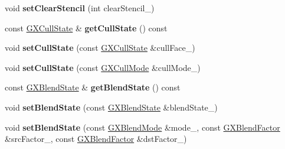 \begin{DoxyCompactItemize}
\item 
void {\bfseries set\+Clear\+Stencil} (int clear\+Stencil\+\_\+)\hypertarget{class_magnum_1_1_g_x_context_a7424d08a9c7340d0867ecd800e5f40be}{}\label{class_magnum_1_1_g_x_context_a7424d08a9c7340d0867ecd800e5f40be}

\item 
const \hyperlink{class_magnum_1_1_g_x_cull_state}{G\+X\+Cull\+State} \& {\bfseries get\+Cull\+State} () const \hypertarget{class_magnum_1_1_g_x_context_af140ab80442d0c94bd66a6c3e5a50275}{}\label{class_magnum_1_1_g_x_context_af140ab80442d0c94bd66a6c3e5a50275}

\item 
void {\bfseries set\+Cull\+State} (const \hyperlink{class_magnum_1_1_g_x_cull_state}{G\+X\+Cull\+State} \&cull\+Face\+\_\+)\hypertarget{class_magnum_1_1_g_x_context_ad4d70bfd517f03e3391a0202585b920e}{}\label{class_magnum_1_1_g_x_context_ad4d70bfd517f03e3391a0202585b920e}

\item 
void {\bfseries set\+Cull\+State} (const \hyperlink{class_magnum_1_1_g_x_cull_mode}{G\+X\+Cull\+Mode} \&cull\+Mode\+\_\+)\hypertarget{class_magnum_1_1_g_x_context_a1a8ebea8c32929a17000a5fc2d740a54}{}\label{class_magnum_1_1_g_x_context_a1a8ebea8c32929a17000a5fc2d740a54}

\item 
const \hyperlink{class_magnum_1_1_g_x_blend_state}{G\+X\+Blend\+State} \& {\bfseries get\+Blend\+State} () const \hypertarget{class_magnum_1_1_g_x_context_a5020d793df64d2fcc7c3804c33a59343}{}\label{class_magnum_1_1_g_x_context_a5020d793df64d2fcc7c3804c33a59343}

\item 
void {\bfseries set\+Blend\+State} (const \hyperlink{class_magnum_1_1_g_x_blend_state}{G\+X\+Blend\+State} \&blend\+State\+\_\+)\hypertarget{class_magnum_1_1_g_x_context_accf3cc9ef423fa6864ecd41f8d5e620b}{}\label{class_magnum_1_1_g_x_context_accf3cc9ef423fa6864ecd41f8d5e620b}

\item 
void {\bfseries set\+Blend\+State} (const \hyperlink{class_magnum_1_1_g_x_blend_mode}{G\+X\+Blend\+Mode} \&mode\+\_\+, const \hyperlink{class_magnum_1_1_g_x_blend_factor}{G\+X\+Blend\+Factor} \&src\+Factor\+\_\+, const \hyperlink{class_magnum_1_1_g_x_blend_factor}{G\+X\+Blend\+Factor} \&dst\+Factor\+\_\+)\hypertarget{class_magnum_1_1_g_x_context_a525c94e3f2c176b86813a15e3b17763f}{}\label{class_magnum_1_1_g_x_context_a525c94e3f2c176b86813a15e3b17763f}


\end{DoxyCompactItemize}
